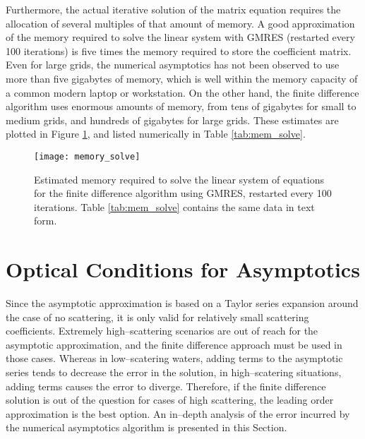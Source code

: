Furthermore, the actual iterative solution of the matrix equation requires the allocation of several multiples of that amount of memory.
A good approximation of the memory required to solve the linear system with GMRES (restarted every 100 iterations) is five times the memory required to store the coefficient matrix.
Even for large grids, the numerical asymptotics has not been observed to use more than five gigabytes of memory, which is well within the memory capacity of a common modern laptop or workstation.
On the other hand, the finite difference algorithm uses enormous amounts of memory, from tens of gigabytes for small to medium grids, and hundreds of gigabytes for large grids.
These estimates are plotted in Figure \ref{fig:mem_solve}, and listed numerically in Table \ref{tab:mem_solve}.
\begin{figure}[H]
  \centering
  \texttt{[image: memory\_solve]}
  \caption{Estimated memory required to solve the linear system of equations for the finite difference algorithm using GMRES, restarted every 100 iterations. Table \ref{tab:mem_solve} contains the same data in text form.}
  \label{fig:mem_solve}
\end{figure}

\section{Optical Conditions for Asymptotics}
Since the asymptotic approximation is based on a Taylor series expansion around the case of no scattering, it is only valid for relatively small scattering coefficients.
Extremely high--scattering scenarios are out of reach for the asymptotic approximation, and the finite difference approach must be used in those cases.
Whereas in low--scatering waters, adding terms to the asymptotic series tends to decrease the error in the solution, in high--scatering situations, adding terms causes the error to diverge.
Therefore, if the finite difference solution is out of the question for cases of high scattering, the leading order approximation is the best option.
An in--depth analysis of the error incurred by the numerical asymptotics algorithm is presented in this Section.

